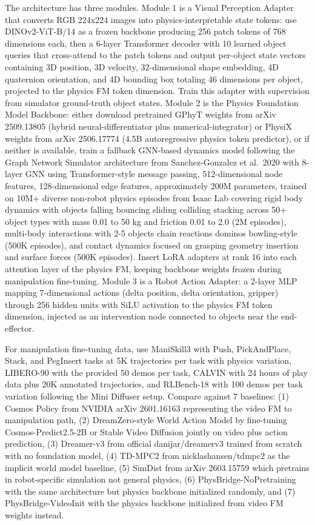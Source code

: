 \documentclass[11pt,a4paper]{article}
\begin{document}
The architecture has three modules. Module 1 is a Visual Perception Adapter that converts RGB 224x224 images into physics-interpretable state tokens: use DINOv2-ViT-B/14 as a frozen backbone producing 256 patch tokens of 768 dimensions each, then a 6-layer Transformer decoder with 10 learned object queries that cross-attend to the patch tokens and output per-object state vectors containing 3D position, 3D velocity, 32-dimensional shape embedding, 4D quaternion orientation, and 4D bounding box totaling 46 dimensions per object, projected to the physics FM token dimension. Train this adapter with supervision from simulator ground-truth object states. Module 2 is the Physics Foundation Model Backbone: either download pretrained GPhyT weights from arXiv 2509.13805 (hybrid neural-differentiator plus numerical-integrator) or PhysiX weights from arXiv 2506.17774 (4.5B autoregressive physics token predictor), or if neither is available, train a fallback GNN-based dynamics model following the Graph Network Simulator architecture from Sanchez-Gonzalez et al.\ 2020 with 8-layer GNN using Transformer-style message passing, 512-dimensional node features, 128-dimensional edge features, approximately 200M parameters, trained on 10M+ diverse non-robot physics episodes from Isaac Lab covering rigid body dynamics with objects falling bouncing sliding colliding stacking across 50+ object types with mass 0.01 to 50 kg and friction 0.01 to 2.0 (2M episodes), multi-body interactions with 2-5 objects chain reactions dominos bowling-style (500K episodes), and contact dynamics focused on grasping geometry insertion and surface forces (500K episodes). Insert LoRA adapters at rank 16 into each attention layer of the physics FM, keeping backbone weights frozen during manipulation fine-tuning. Module 3 is a Robot Action Adapter: a 2-layer MLP mapping 7-dimensional actions (delta position, delta orientation, gripper) through 256 hidden units with SiLU activation to the physics FM token dimension, injected as an intervention node connected to objects near the end-effector.

For manipulation fine-tuning data, use ManiSkill3 with Push, PickAndPlace, Stack, and PegInsert tasks at 5K trajectories per task with physics variation, LIBERO-90 with the provided 50 demos per task, CALVIN with 24 hours of play data plus 20K annotated trajectories, and RLBench-18 with 100 demos per task variation following the Mini Diffuser setup. Compare against 7 baselines: (1) Cosmos Policy from NVIDIA arXiv 2601.16163 representing the video FM to manipulation path, (2) DreamZero-style World Action Model by fine-tuning Cosmos-Predict2.5-2B or Stable Video Diffusion jointly on video plus action prediction, (3) Dreamer-v3 from official danijar/dreamerv3 trained from scratch with no foundation model, (4) TD-MPC2 from nicklashansen/tdmpc2 as the implicit world model baseline, (5) SimDist from arXiv 2603.15759 which pretrains in robot-specific simulation not general physics, (6) PhysBridge-NoPretraining with the same architecture but physics backbone initialized randomly, and (7) PhysBridge-VideoInit with the physics backbone initialized from video FM weights instead.
\end{document}
